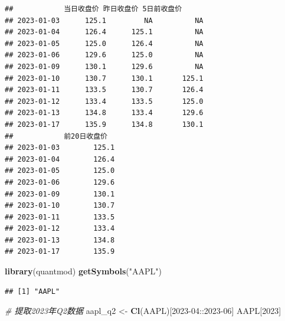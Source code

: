 \documentclass[]{ctexbook}
\newenvironment{Shaded}{\begin{snugshade}}{\end{snugshade}}
\newcommand{\CommentTok}[1]{\textcolor[rgb]{0.56,0.35,0.01}{\textit{#1}}}
\newcommand{\FunctionTok}[1]{\textcolor[rgb]{0.13,0.29,0.53}{\textbf{#1}}}
\newcommand{\NormalTok}[1]{#1}
\newcommand{\OtherTok}[1]{\textcolor[rgb]{0.56,0.35,0.01}{#1}}
\newcommand{\StringTok}[1]{\textcolor[rgb]{0.31,0.60,0.02}{#1}}
\begin{document}
\begin{verbatim}
##            当日收盘价 昨日收盘价 5日前收盘价
## 2023-01-03      125.1         NA          NA
## 2023-01-04      126.4      125.1          NA
## 2023-01-05      125.0      126.4          NA
## 2023-01-06      129.6      125.0          NA
## 2023-01-09      130.1      129.6          NA
## 2023-01-10      130.7      130.1       125.1
## 2023-01-11      133.5      130.7       126.4
## 2023-01-12      133.4      133.5       125.0
## 2023-01-13      134.8      133.4       129.6
## 2023-01-17      135.9      134.8       130.1
##            前20日收盘价
## 2023-01-03        125.1
## 2023-01-04        126.4
## 2023-01-05        125.0
## 2023-01-06        129.6
## 2023-01-09        130.1
## 2023-01-10        130.7
## 2023-01-11        133.5
## 2023-01-12        133.4
## 2023-01-13        134.8
## 2023-01-17        135.9
\end{verbatim}

\begin{Shaded}
\begin{Highlighting}[]
\FunctionTok{library}\NormalTok{(quantmod)}
\FunctionTok{getSymbols}\NormalTok{(}\StringTok{"AAPL"}\NormalTok{)}
\end{Highlighting}
\end{Shaded}

\begin{verbatim}
## [1] "AAPL"
\end{verbatim}

\begin{Shaded}
\begin{Highlighting}[]
\CommentTok{\# 提取2023年Q2数据}
\NormalTok{aapl\_q2 }\OtherTok{\textless{}{-}} \FunctionTok{Cl}\NormalTok{(AAPL)[}\StringTok{\textquotesingle{}2023{-}04::2023{-}06\textquotesingle{}}\NormalTok{]}
\NormalTok{AAPL[}\StringTok{\textquotesingle{}2023\textquotesingle{}}\NormalTok{]}
\end{Highlighting}
\end{Shaded}
\end{document}
